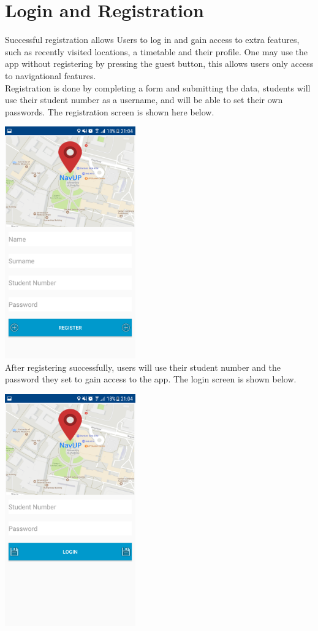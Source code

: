 \documentclass{article}
\begin{document}
\newpage
\section{Login and Registration}
	Successful registration allows Users to log in and gain access to extra features, such as recently visited locations, a timetable and their profile. One may use the app without registering by pressing the guest button, this allows users only access to navigational features.
	\\
	Registration is done by completing a form and submitting the data, students will use their student number as a username, and will be able to set their own passwords. The registration screen is shown here below.
	\\
	\par
	\includegraphics[height=10cm]{navupregister.png}
	\\
	After registering successfully, users will use their student number and the password they set to gain access to the app. The login screen is shown below.
	\\
	\par
	\includegraphics[height=10cm]{navuplogin1.png}
\end{document}
